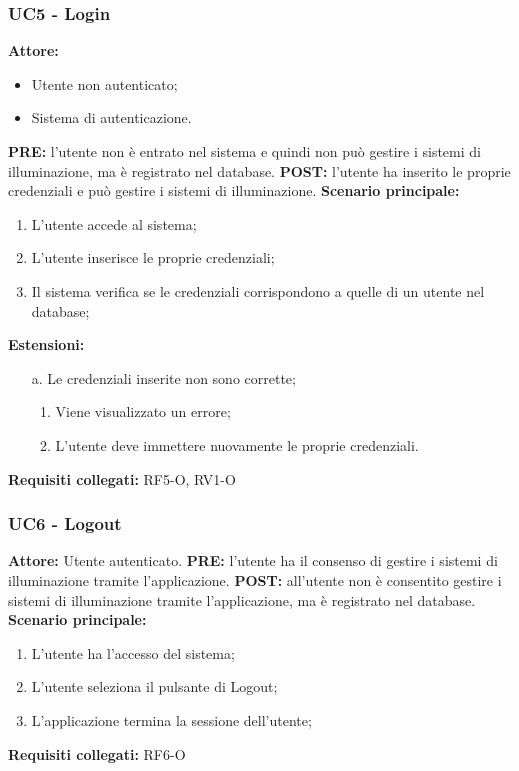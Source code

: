 \documentclass[a4paper, 12pt]{article}
\begin{document}
\subsubsection{UC5 - Login}
\textbf{Attore:}
\begin{itemize}
    \item Utente non autenticato;
    \item Sistema di autenticazione.
\end{itemize}
\textbf{PRE:} l'utente non è entrato nel sistema e quindi non può gestire i sistemi di illuminazione, ma è registrato nel database.\newline
\textbf{POST:} l'utente ha inserito le proprie credenziali e può gestire i sistemi di illuminazione.\newline
\textbf{Scenario principale:}
\begin{enumerate}
    \item L'utente accede al sistema;
    \item L'utente inserisce le proprie credenziali;
    \item Il sistema verifica se le credenziali corrispondono a quelle di un utente nel database;
\end{enumerate}
\textbf{Estensioni:}
\begin{itemize}
    \item [a.] Le credenziali inserite non sono corrette;
          \begin{enumerate}
              \item Viene visualizzato un errore;
              \item L'utente deve immettere nuovamente le proprie credenziali.
          \end{enumerate}
\end{itemize}
\textbf{Requisiti collegati:} RF5-O, RV1-O\newline

\subsubsection{UC6 - Logout}
\textbf{Attore:} Utente autenticato.\newline
\textbf{PRE:} l'utente ha il consenso di gestire i sistemi di illuminazione tramite l'applicazione.\newline
\textbf{POST:} all'utente non è consentito gestire i sistemi di illuminazione tramite l'applicazione, ma è registrato nel database.\newline
\textbf{Scenario principale:}
\begin{enumerate}
    \item L'utente ha l'accesso del sistema;
    \item L'utente seleziona il pulsante di Logout;
    \item L'applicazione termina la sessione dell'utente;
\end{enumerate}
\textbf{Requisiti collegati:} RF6-O\newline
\end{document}
